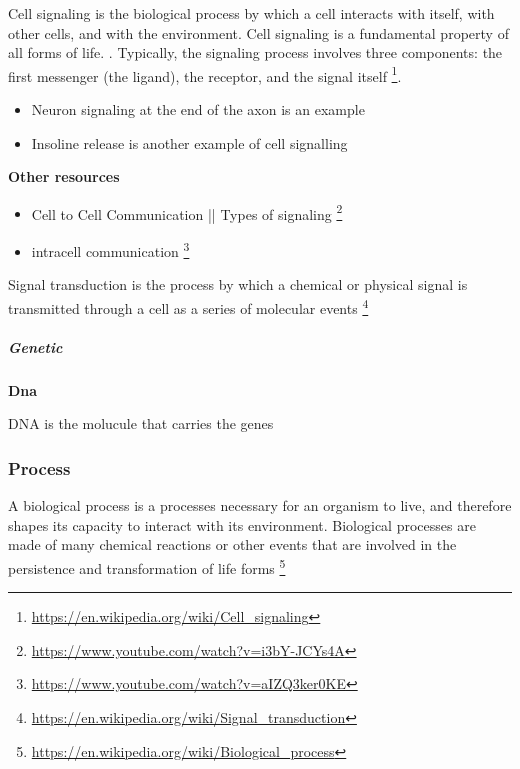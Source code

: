 \documentclass{book}
\providecommand{\ProjectDeepHeading}[2]{%
    \par\medskip\noindent\textbf{#2}\par\smallskip
}
\providecommand{\seeherefooter}[1]{\footnote{\url{#1}}}
\begin{document}
Cell signaling is the biological process by which a cell interacts with itself, with other cells, and with the environment. Cell signaling is a fundamental property of all forms of life. . Typically, the signaling process involves three components: the first messenger (the ligand), the receptor, and the signal itself \seeherefooter{https://en.wikipedia.org/wiki/Cell_signaling}.
    
    \begin{itemize}
        \item Neuron signaling at the end of the axon is an example
        \item Insoline release is another example of cell signalling
    \end{itemize}
    
    \textbf{Other resources}
    \begin{itemize}
        \item Cell to Cell Communication || Types of signaling \seeherefooter{https://www.youtube.com/watch?v=i3bY-JCYs4A}
        \item intracell communication \seeherefooter{https://www.youtube.com/watch?v=aIZQ3ker0KE}
    \end{itemize}


Signal transduction is the process by which a chemical or physical signal is transmitted through a cell as a series of molecular events \seeherefooter{https://en.wikipedia.org/wiki/Signal_transduction}

\subparagraph{Genetic}

\ProjectDeepHeading{1}{Dna}


DNA is the molucule that carries the genes

\subsubsection{Process}


A biological process is a processes necessary for an organism to live, and therefore shapes its capacity to interact with its environment. Biological processes are made of many chemical reactions or other events that are involved in the persistence and transformation of life forms
    \seeherefooter{https://en.wikipedia.org/wiki/Biological_process}
\end{document}
